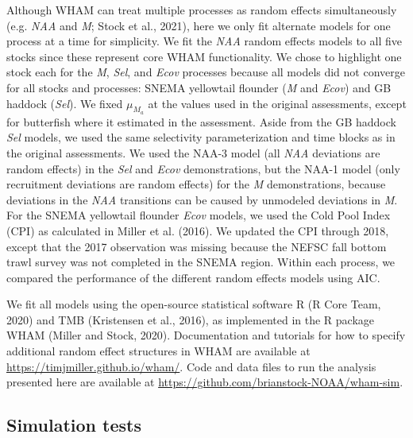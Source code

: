 \documentclass[]{article}
\begin{document}
Although WHAM can treat multiple processes as random effects
simultaneously (e.g. \emph{NAA} and \emph{M}; Stock et al., 2021), here
we only fit alternate models for one process at a time for simplicity.
We fit the \emph{NAA} random effects models to all five stocks since
these represent core WHAM functionality. We chose to highlight one stock
each for the \emph{M}, \emph{Sel}, and \emph{Ecov} processes because all
models did not converge for all stocks and processes: SNEMA yellowtail
flounder (\emph{M} and \emph{Ecov}) and GB haddock (\emph{Sel}). We
fixed \(\mu_{M_a}\) at the values used in the original assessments,
except for butterfish where it estimated in the assessment. Aside from
the GB haddock \emph{Sel} models, we used the same selectivity
parameterization and time blocks as in the original assessments. We used
the NAA-3 model (all \emph{NAA} deviations are random effects) in the
\emph{Sel} and \emph{Ecov} demonstrations, but the NAA-1 model (only
recruitment deviations are random effects) for the \emph{M}
demonstrations, because deviations in the \emph{NAA} transitions can be
caused by unmodeled deviations in \emph{M}. For the SNEMA yellowtail
flounder \emph{Ecov} models, we used the Cold Pool Index (CPI) as
calculated in Miller et al. (2016). We updated the CPI through 2018,
except that the 2017 observation was missing because the NEFSC fall
bottom trawl survey was not completed in the SNEMA region. Within each
process, we compared the performance of the different random effects
models using AIC.

We fit all models using the open-source statistical software R (R Core
Team, 2020) and TMB (Kristensen et al., 2016), as implemented in the R
package WHAM (Miller and Stock, 2020). Documentation and tutorials for
how to specify additional random effect structures in WHAM are available
at \url{https://timjmiller.github.io/wham/}. Code and data files to run
the analysis presented here are available at
\url{https://github.com/brianstock-NOAA/wham-sim}.

\hypertarget{simulation-tests}{%
\subsection{Simulation tests}\label{simulation-tests}}
\end{document}
